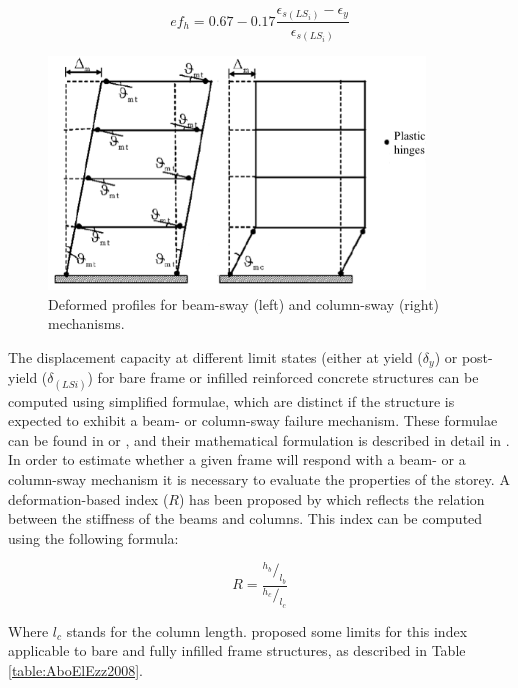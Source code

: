 \begin{equation}
ef_h = 0.67 - 0.17\frac{\epsilon_{s(LS_i)}-\epsilon_y}{\epsilon_{s(LS_i)}}
\end{equation}
 
\begin{figure}[htb]
  \centering
      \includegraphics[width=10cm]{Figures/collapse_mechanisms.png}
  \caption{Deformed profiles for beam-sway (left) and column-sway (right) mechanisms\cite{PaulayPriestley2002}.}
  \label{fig:mechanisms}
\end{figure}

The displacement capacity at different limit states (either at yield ($\delta_y$) or post-yield ($\delta_{(LSi)}$) for bare frame or infilled reinforced concrete structures can be computed using simplified formulae, which are distinct if the structure is expected to exhibit a beam- or column-sway failure mechanism. These formulae can be found in \cite{BalEtAl2010} or \cite{SilvaEtAl2013}, and their mathematical formulation is described in detail in \cite{CrowleyEtAl2004}.\\

In order to estimate whether a given frame will respond with a beam- or a column-sway mechanism it is necessary to evaluate the properties of the storey. A deformation-based index ($R$) has been proposed by \cite{AboElEzz2008} which reflects the relation between the stiffness of the beams and columns. This index can be computed using the following formula:

\begin{equation}
R = \frac{^{h_b}/_{l_b}}{^{h_c}/_{l_c}}
\end{equation}

Where $l_c$ stands for the column length. \cite{AboElEzz2008} proposed some limits for this index applicable to bare and fully infilled frame structures, as described in Table \ref{table:AboElEzz2008}.

